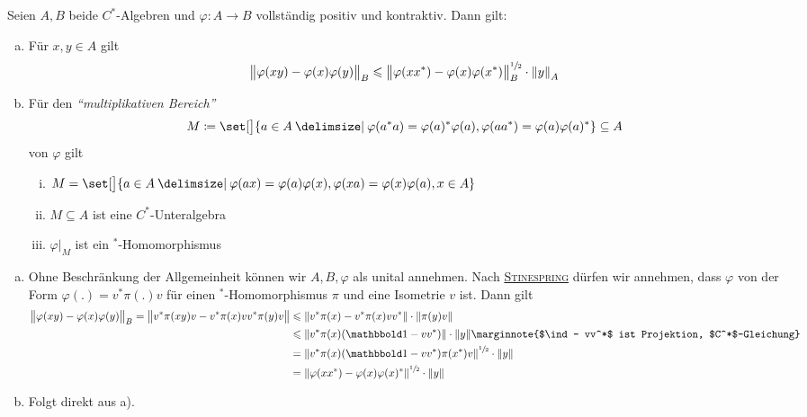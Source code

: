 \begin{lemma}[label=lem:320]
	Seien $A,B$ beide $C^*$-Algebren und $\varphi \colon A \to B$ vollständig positiv und kontraktiv.
	Dann gilt:
	\begin{enumerate}[a)]
		\item Für $x,y \in A$ gilt
		\[
			\norm[\big]{\varphi(xy) -\varphi(x) \varphi(y)}_B \le \norm[\big]{\varphi(xx^*) -\varphi(x) \varphi(x^*)}_B^{\sfrac{1}{2}} \cdot \norm*{y}_A
		\]
		\item Für den \emph{\enquote{multiplikativen Bereich}} 
		\[
			M \coloneqq \set[\big]{a \in A \given \varphi(a^*a) = \varphi(a)^* \varphi(a), \varphi(aa^*)= \varphi(a)\varphi(a)^*} \subseteq A
		\]
		von $\varphi$ gilt
		\begin{enumerate}[i)]
			\item $M= \set[\big]{a \in A \given \varphi(ax)=\varphi(a)\varphi(x), \varphi(xa)=\varphi(x) \varphi(a) , x \in A}$
			\item $M \subseteq A$ ist eine $C^*$-Unteralgebra
			\item $\varphi\big|_M$ ist ein $^*$-Homomorphismus
		\end{enumerate}
	\end{enumerate}
\end{lemma}
\begin{beweis}
	\begin{enumerate}[a)]
		\item Ohne Beschränkung der Allgemeinheit können wir $A,B,\varphi$ als unital annehmen.
		Nach \hyperref[satz:319]{\textsc{Stinespring}} dürfen wir annehmen, dass $\varphi$ von der Form $\varphi(.) = v^* \pi(.)v$ für einen $^*$-Homomorphismus $\pi$ und eine Isometrie $v$ ist.
		Dann gilt
		\begin{align}
			\norm[\big]{\varphi(xy) -\varphi(x) \varphi(y)}_B = \norm[\big]{v^*\pi(xy)v - v^*\pi(x)vv^*\pi(y)v} &\le \norm*{v^* \pi(x) - v^*\pi(x)vv^*} \cdot \norm*{\pi(y)v} \\
			&\le \norm*{v^* \pi(x)(\ind -vv^*)} \cdot \norm*{y} \marginnote{$\ind- vv^*$ ist Projektion, $C^*$-Gleichung} \\
			&= \norm*{v^* \pi(x) (\ind -vv^*) \pi(x^*) v}^{\sfrac{1}{2}} \cdot \norm*{y} \\
			&= \norm*{\varphi(xx^*) - \varphi(x)\varphi(x)^*}^{\sfrac{1}{2}} \cdot \norm*{y}
		\end{align}
		\item Folgt direkt aus a). \qedhere
	\end{enumerate}
\end{beweis}

